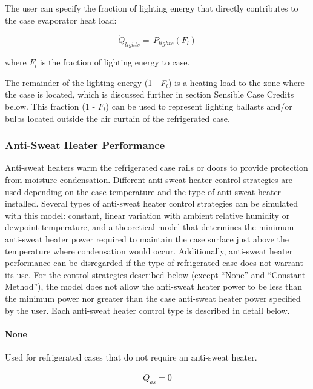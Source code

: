 The user can specify the fraction of lighting energy that directly contributes to the case evaporator heat load:

\begin{equation}
{\dot Q_{lights}} = \,{P_{lights}}\left( {{F_l}} \right)
\end{equation}

where \({F_l}\) is the fraction of lighting energy to case.

The remainder of the lighting energy (1 - \emph{F\(_{l}\)}) is a heating load to the zone where the case is located, which is discussed further in section Sensible Case Credits below. This fraction (1 - \emph{F\(_{l}\)}) can be used to represent lighting ballasts and/or bulbs located outside the air curtain of the refrigerated case.

\subsubsection{Anti-Sweat Heater Performance}\label{anti-sweat-heater-performance}

Anti-sweat heaters warm the refrigerated case rails or doors to provide protection from moisture condensation. Different anti-sweat heater control strategies are used depending on the case temperature and the type of anti-sweat heater installed. Several types of anti-sweat heater control strategies can be simulated with this model: constant, linear variation with ambient relative humidity or dewpoint temperature, and a theoretical model that determines the minimum anti-sweat heater power required to maintain the case surface just above the temperature where condensation would occur. Additionally, anti-sweat heater performance can be disregarded if the type of refrigerated case does not warrant its use. For the control strategies described below (except ``None'' and ``Constant Method''), the model does not allow the anti-sweat heater power to be less than the minimum power nor greater than the case anti-sweat heater power specified by the user. Each anti-sweat heater control type is described in detail below.

\paragraph{None}\label{none}

Used for refrigerated cases that do not require an anti-sweat heater.

\begin{equation}
{\dot Q_{as}} = 0
\end{equation}

